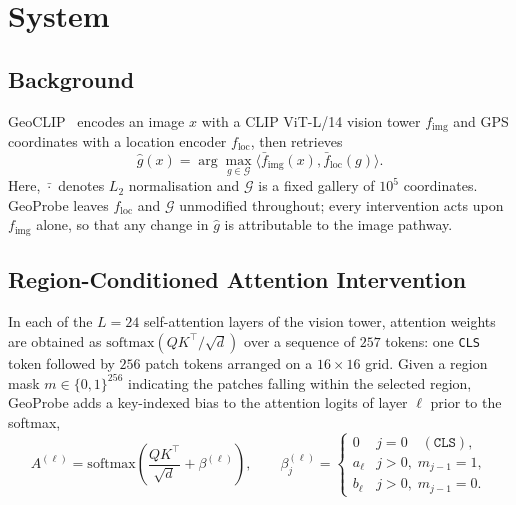 \section{System}
\label{sec:system}

\subsection{Background}

GeoCLIP~\cite{cepeda2023geoclip} encodes an image $x$ with a CLIP ViT-L/14
vision tower $f_{\mathrm{img}}$ and GPS coordinates with a location encoder
$f_{\mathrm{loc}}$, then retrieves
\begin{equation*}
\hat{g}(x)=\arg\max_{g\in\mathcal{G}}
\langle\bar f_{\mathrm{img}}(x),\bar f_{\mathrm{loc}}(g)\rangle .
\end{equation*}
Here, $\bar{\cdot}$ denotes $L_2$ normalisation and $\mathcal{G}$ is a fixed
gallery of $10^{5}$ coordinates. GeoProbe leaves $f_{\mathrm{loc}}$ and
$\mathcal{G}$ unmodified throughout; every intervention acts upon
$f_{\mathrm{img}}$ alone, so that any change in $\hat{g}$ is attributable to
the image pathway.

\subsection{Region-Conditioned Attention Intervention}
\label{sec:intervention}

In each of the $L=24$ self-attention layers of the vision tower, attention
weights are obtained as $\mathrm{softmax}(QK^{\top}/\sqrt{d})$ over a
sequence of $257$ tokens: one \texttt{CLS} token followed by $256$ patch
tokens arranged on a $16 \times 16$ grid. Given a region mask
$m \in \{0,1\}^{256}$ indicating the patches falling within the selected
region, GeoProbe adds a key-indexed bias to the attention logits of layer
$\ell$ prior to the softmax,
\begin{equation}
  A^{(\ell)} = \mathrm{softmax}\!\left(
  \frac{QK^{\top}}{\sqrt{d}} + \beta^{(\ell)} \right),
  \qquad
  \beta^{(\ell)}_{j} =
  \begin{cases}
    0      & j = 0 \quad (\texttt{CLS}), \\
    a_\ell & j > 0,\; m_{j-1} = 1, \\
    b_\ell & j > 0,\; m_{j-1} = 0.
  \end{cases}
  \label{eq:bias}
\end{equation}


